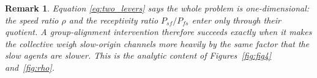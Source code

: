 \documentclass{article}
\newcommand{\Pab}[2]{P_{#1#2}}      %
\newtheorem{remark}{Remark}
\begin{document}
\begin{remark}
Equation \eqref{eq:two_levers} says the whole problem is one-dimensional: the speed ratio $\rho$ and the receptivity ratio $\Pab{s}{f}/\Pab{f}{s}$ enter only through their quotient. A group-alignment intervention therefore succeeds exactly when it makes the collective weigh slow-origin channels more heavily by the same factor that the slow agents are slower. This is the analytic content of Figures~\ref{fig:fig4} and~\ref{fig:rho}.
\end{remark}
\end{document}

